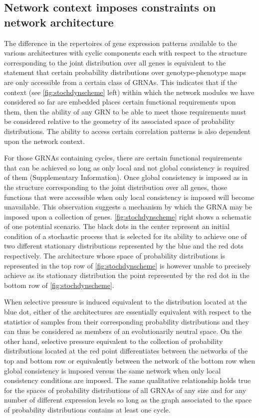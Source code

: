 \subsection{Network context imposes constraints on network architecture}

The difference in the repertoires of gene expression patterns available to the various architectures with cyclic components each with respect to the structure corresponding to the joint distribution over all genes is equivalent to the statement that certain probability distributions over genotype-phenotype maps are only accessible from a certain class of GRNAs. This indicates that if the context (see \ref{fig:stochdynscheme} left) within which the network modules we have considered so far are embedded places certain functional requirements upon them, then the ability of any GRN to be able to meet those requirements must be considered relative to the geometry of its associated space of probability distributions. The ability to access certain correlation patterns is also dependent upon the network context.

For those GRNAs containing cycles, there are certain functional requirements that can be achieved so long as only local and not global consistency is required of them (Supplementary Information). Once global consistency is imposed as in the structure corresponding to the joint distribution over all genes, those functions that were accessible when only local consistency is imposed will become unavailable. This observation suggests a mechanism by which the GRNA may be imposed upon a collection of genes. \ref{fig:stochdynscheme} right shows a schematic of one potential scenario. The black dots in the center represent an initial condition of a stochastic process that is selected for its ability to achieve one of two different stationary distributions represented by the blue and the red dots respectively. The architecture whose space of probability distributions is represented in the top row of \ref{fig:stochdynscheme} is however unable to precisely achieve as its stationary distribution the point represented by the red dot in the bottom row of \ref{fig:stochdynscheme}.

When selective pressure is induced equivalent to the distribution located at the blue dot, either of the architectures are essentially equivalent with respect to the statistics of samples from their corresponding probability distributions and they can thus be considered as members of an evolutionarily neutral space. On the other hand, selective pressure equivalent to the collection of probability distributions located at the red point differentiates between the networks of the top and bottom row or equivalently between the network of the bottom row when global consistency is imposed versus the same network when only local consistency conditions are imposed. The same qualitative relationship holds true for the spaces of probability distributions of all GRNAs of any size and for any number of different expression levels so long as the graph associated to the space of probability distributions contains at least one cycle.
